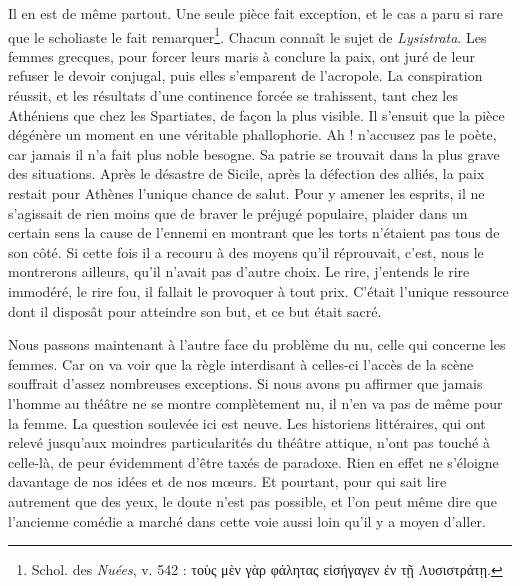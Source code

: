 \documentclass{book}%
\newcommand{\italique}[1]{\textit{#1}}%
\newcommand{\note}[1]{\footnote{#1}}
\begin{document}
Il en est de même partout. Une seule pièce fait exception, et le cas a paru si rare que le scholiaste le fait remarquer\note{Schol. des \italique{Nuées}, v. 542 : τοὺς μὲν γὰρ φάλητας εἰσήγαγεν ἐν τῇ Λυσιστράτῃ.}. Chacun connaît le sujet de \italique{Lysistrata}. Les femmes grecques, pour forcer leurs maris à conclure la paix, ont juré de leur refuser le devoir conjugal, puis elles s'emparent de l'acropole. La conspiration réussit, et les résultats d'une continence forcée se trahissent, tant chez les Athéniens que chez les Spartiates, de façon la plus visible. Il s'ensuit que la pièce dégénère un moment en une véritable phallophorie. Ah ! n'accusez pas le poète, car jamais il n'a fait plus noble besogne. Sa patrie se trouvait dans la plus grave des situations. Après le désastre de Sicile, après la défection des alliés, la paix restait pour Athènes l'unique chance de salut. Pour y amener les esprits, il ne s'agissait de rien moins que de braver le préjugé populaire, plaider dans un certain sens la cause de l'ennemi en montrant que les torts n'étaient pas tous de son côté. 
Si cette fois il a recouru à des moyens qu'il réprouvait, c'est, nous le montrerons ailleurs, qu'il n'avait pas d'autre choix. Le rire, j'entends le rire immodéré, le rire fou, il fallait le provoquer à tout prix. C'était l'unique ressource dont il disposât pour atteindre son but, et ce but était sacré. 

Nous passons maintenant à l'autre face du problème du nu, celle qui concerne les femmes. Car on va voir que la règle interdisant à celles-ci l'accès de la scène souffrait d'assez nombreuses exceptions. Si nous avons pu affirmer que jamais l'homme au théâtre ne se montre complètement nu, il n'en va pas de même pour la femme. La question soulevée ici est neuve. Les historiens littéraires, qui ont relevé jusqu'aux moindres particularités du théâtre attique, n'ont pas touché à celle-là, de peur évidemment d'être taxés de paradoxe. Rien en effet ne s'éloigne davantage de nos idées et de nos mœurs. Et pourtant, pour qui sait lire autrement que des yeux, le doute n'est pas possible, et l'on peut même dire que l'ancienne comédie a marché dans cette voie aussi loin qu'il y a moyen d'aller. 
\end{document}

